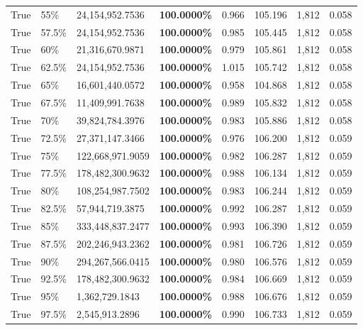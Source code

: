 \begin{table}[H]
\begin{tabular}{lllrllll}
\cline{1-8} \cline{2-8}
True & 55\% & 24,154,952.7536 & \bfseries \color{red} 100.0000\% & 0.966 & 105.196 & 1,812 & 0.058 \\
\cline{1-8} \cline{2-8}
True & 57.5\% & 24,154,952.7536 & \bfseries \color{red} 100.0000\% & 0.985 & 105.445 & 1,812 & 0.058 \\
\cline{1-8} \cline{2-8}
True & 60\% & 21,316,670.9871 & \bfseries \color{red} 100.0000\% & 0.979 & 105.861 & 1,812 & 0.058 \\
\cline{1-8} \cline{2-8}
True & 62.5\% & 24,154,952.7536 & \bfseries \color{red} 100.0000\% & 1.015 & 105.742 & 1,812 & 0.058 \\
\cline{1-8} \cline{2-8}
True & 65\% & 16,601,440.0572 & \bfseries \color{red} 100.0000\% & 0.958 & 104.868 & 1,812 & 0.058 \\
\cline{1-8} \cline{2-8}
True & 67.5\% & 11,409,991.7638 & \bfseries \color{red} 100.0000\% & 0.989 & 105.832 & 1,812 & 0.058 \\
\cline{1-8} \cline{2-8}
True & 70\% & 39,824,784.3976 & \bfseries \color{red} 100.0000\% & 0.983 & 105.886 & 1,812 & 0.058 \\
\cline{1-8} \cline{2-8}
True & 72.5\% & 27,371,147.3466 & \bfseries \color{red} 100.0000\% & 0.976 & 106.200 & 1,812 & 0.059 \\
\cline{1-8} \cline{2-8}
True & 75\% & 122,668,971.9059 & \bfseries \color{red} 100.0000\% & 0.982 & 106.287 & 1,812 & 0.059 \\
\cline{1-8} \cline{2-8}
True & 77.5\% & 178,482,300.9632 & \bfseries \color{red} 100.0000\% & 0.988 & 106.134 & 1,812 & 0.059 \\
\cline{1-8} \cline{2-8}
True & 80\% & 108,254,987.7502 & \bfseries \color{red} 100.0000\% & 0.983 & 106.244 & 1,812 & 0.059 \\
\cline{1-8} \cline{2-8}
True & 82.5\% & 57,944,719.3875 & \bfseries \color{red} 100.0000\% & 0.992 & 106.287 & 1,812 & 0.059 \\
\cline{1-8} \cline{2-8}
True & 85\% & 333,448,837.2477 & \bfseries \color{red} 100.0000\% & 0.993 & 106.390 & 1,812 & 0.059 \\
\cline{1-8} \cline{2-8}
True & 87.5\% & 202,246,943.2362 & \bfseries \color{red} 100.0000\% & 0.981 & 106.726 & 1,812 & 0.059 \\
\cline{1-8} \cline{2-8}
True & 90\% & 294,267,566.0415 & \bfseries \color{red} 100.0000\% & 0.980 & 106.576 & 1,812 & 0.059 \\
\cline{1-8} \cline{2-8}
True & 92.5\% & 178,482,300.9632 & \bfseries \color{red} 100.0000\% & 0.984 & 106.669 & 1,812 & 0.059 \\
\cline{1-8} \cline{2-8}
True & 95\% & 1,362,729.1843 & \bfseries \color{red} 100.0000\% & 0.988 & 106.676 & 1,812 & 0.059 \\
\cline{1-8} \cline{2-8}
True & 97.5\% & 2,545,913.2896 & \bfseries \color{red} 100.0000\% & 0.990 & 106.733 & 1,812 & 0.059 \\
\cline{1-8} \cline{2-8}
\bottomrule
\end{tabular}
\end{table}
